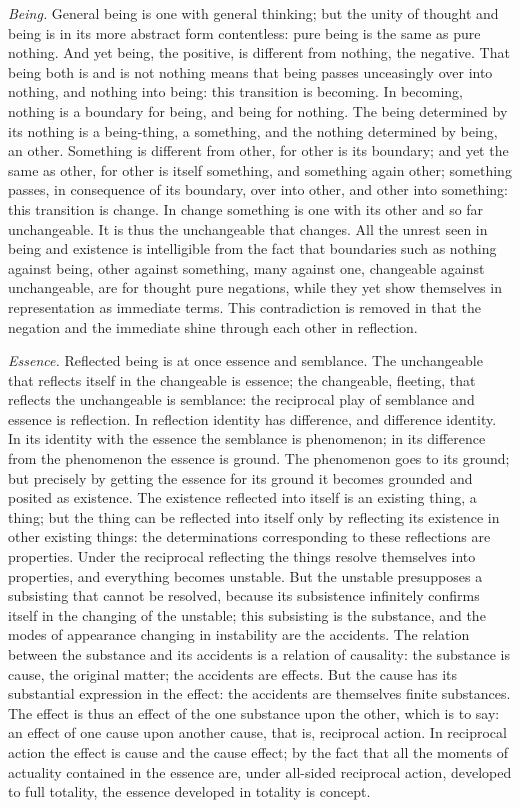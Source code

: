 \documentclass[12pt]{book}
\begin{document}
\emph{Being.} General being is one with general thinking; but the unity of
thought and being is in its more abstract form contentless: pure being is the
same as pure nothing. And yet being, the positive, is different from nothing, the
negative. That being both is and is not nothing means that being passes
unceasingly over into nothing, and nothing into being: this transition is
becoming. In becoming, nothing is a boundary for being, and being for nothing.
The being determined by its nothing is a being-thing, a something, and the
nothing determined by being, an other. Something is different from other, for
other is its boundary; and yet the same as other, for other is itself something,
and something again other; something passes, in consequence of its boundary,
over into other, and other into something: this transition is change. In change
something is one with its other and so far unchangeable. It is thus the
unchangeable that changes. All the unrest seen in being and existence is
intelligible from the fact that boundaries such as nothing against being, other
against something, many against one, changeable against unchangeable, are for
thought pure negations, while they yet show themselves in representation as
immediate terms. This contradiction is removed in that the negation and the
immediate shine through each other in reflection.

\emph{Essence.} Reflected being is at once essence and semblance. The
unchangeable that reflects itself in the changeable is essence; the changeable,
fleeting, that reflects the unchangeable is semblance: the reciprocal play of
semblance and essence is reflection. In reflection identity has difference, and
difference identity. In its identity with the essence the semblance is
phenomenon; in its difference from the phenomenon the essence is ground. The
phenomenon goes to its ground; but precisely by getting the essence for its
ground it becomes grounded and posited as existence. The existence reflected into
itself is an existing thing, a thing; but the thing can be reflected into itself
only by reflecting its existence in other existing things: the determinations
corresponding to these reflections are properties. Under the reciprocal
reflecting the things resolve themselves into properties, and everything becomes
unstable. But the unstable presupposes a subsisting that cannot be resolved,
because its subsistence infinitely confirms itself in the changing of the
unstable; this subsisting is the substance, and the modes of appearance changing
in instability are the accidents. The relation between the substance and its
accidents is a relation of causality: the substance is cause, the original
matter; the accidents are effects. But the cause has its substantial expression
in the effect: the accidents are themselves finite substances. The effect is
thus an effect of the one substance upon the other, which is to say: an effect of
one cause upon another cause, that is, reciprocal action. In reciprocal action
the effect is cause and the cause effect; by the fact that all the moments of
actuality contained in the essence are, under all-sided reciprocal action,
developed to full totality, the essence developed in totality is concept.
\end{document}
